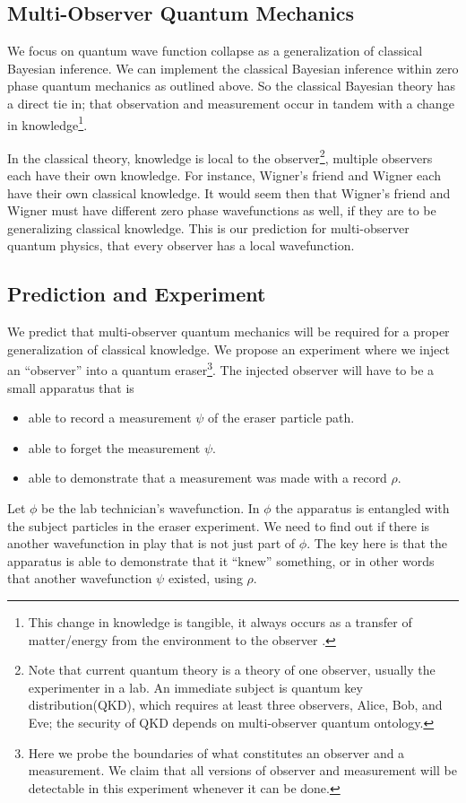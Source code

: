 \documentclass[12pt,a4paper]{article}
\theoremstyle{myrule}
\theoremstyle{postulate}
\theoremstyle{definition}
\begin{document}
\subsection{Multi-Observer Quantum Mechanics}
We focus on quantum wave function collapse as a generalization of classical Bayesian inference.  We can implement the classical Bayesian inference within zero phase quantum mechanics as outlined above.  So the classical Bayesian theory has a direct tie in; that observation and measurement occur in tandem with a change in knowledge\footnote{This change in knowledge is tangible, it always occurs as a transfer of matter/energy from the environment to the observer \cite{thrust}.}.  

In the classical theory, knowledge is local to the observer\footnote{Note that current quantum theory is a theory of one observer, usually the experimenter in a lab.  An immediate subject is quantum key distribution(QKD), which requires at least three observers, Alice, Bob, and Eve; the security of QKD depends on multi-observer quantum ontology.}, multiple observers each have their own knowledge.  For instance, Wigner's friend and Wigner each have their own classical knowledge.  It would seem then that Wigner's friend and Wigner must have different zero phase wavefunctions as well, if they are to be generalizing classical knowledge.  This is our prediction for multi-observer quantum physics, that every observer has a local wavefunction. 

\subsection{Prediction and Experiment}

We predict that multi-observer quantum mechanics will be required for a proper generalization of classical knowledge.  We propose an experiment where we inject an ``observer'' into a quantum eraser\footnote{Here we probe the boundaries of what constitutes an observer and a measurement.  We claim that all versions of observer and measurement will be detectable in this experiment whenever it can be done.}.  The injected observer will have to be a small apparatus that is
\begin{itemize}
   \item able to record a measurement $\psi$ of the eraser particle path.
   \item able to forget the measurement $\psi$.
   \item able to demonstrate that a measurement was made with a record $\rho$.
\end{itemize}
Let $\phi$ be the lab technician's wavefunction.  In $\phi$ the apparatus is entangled with the subject particles in the eraser experiment.  We need to find out if there is another wavefunction in play that is not just part of $\phi$.  The key here is that the apparatus is able to demonstrate that it ``knew'' something, or in other words that another wavefunction $\psi$ existed, using $\rho$.
\end{document}
